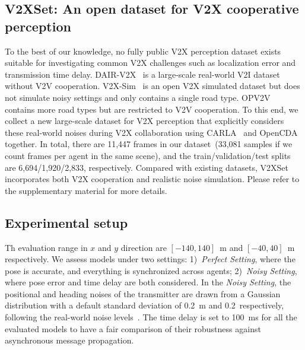 \documentclass[runningheads]{llncs}
\begin{document}
\subsection{V2XSet: An open dataset for V2X cooperative perception}
\label{sec:dataset}
To the best of our knowledge, no fully public V2X perception dataset exists suitable for investigating common V2X challenges such as localization error and transmission time delay.
DAIR-V2X~\cite{DAIR-V2X2021} is a large-scale real-world V2I dataset without V2V cooperation. V2X-Sim~\cite{Li_2021_RAL} is an open V2X simulated dataset but does not simulate noisy settings and only contains a single road type. OPV2V~\cite{xu2021opv2v} contains more road types but are restricted to V2V cooperation.
To this end, we collect a new large-scale dataset for V2X perception that explicitly considers these real-world noises during V2X collaboration using CARLA~\cite{Dosovitskiy17} and OpenCDA~\cite{xu2021opencda} together. 
In total, there are 11,447 frames in our dataset~(33,081 samples if we count frames per agent in the same scene), and the train/validation/test splits are 6,694/1,920/2,833, respectively. Compared with existing datasets, V2XSet incorporates both V2X cooperation and realistic noise simulation. Please refer to the supplementary material for more details.


\subsection{Experimental setup}
Th evaluation range in $x$ and $y$ direction are $[-140, 140]$~m and $[-40, 40]$~m respectively.  
We assess models under two settings: 1)~\textit{Perfect Setting}, where the pose is accurate, and everything is synchronized across agents; 2)~\textit{Noisy Setting}, where pose error and time delay are both considered. In the \textit{Noisy Setting},  the positional and heading noises of the transmitter are drawn from a Gaussian distribution with a default standard deviation of 0.2~m and 0.2\textdegree~respectively, following the real-world noise levels~\cite{xia2021advancing,li2020toward,RT3000}. The time delay is set to 100~ms for all the evaluated models to have a fair comparison of their robustness against asynchronous message propagation.
\end{document}
